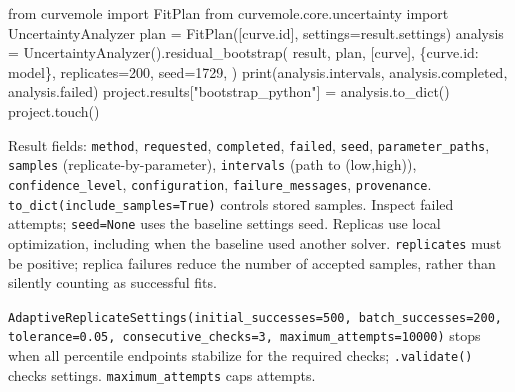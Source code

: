 \documentclass[
  10pt,
  a4paper,
  oneside]{scrreprt}
\newenvironment{Shaded}{}{}
\newcommand{\BuiltInTok}[1]{#1}
\newcommand{\DecValTok}[1]{\textcolor[rgb]{0.25,0.63,0.44}{#1}}
\newcommand{\ImportTok}[1]{#1}
\newcommand{\NormalTok}[1]{#1}
\newcommand{\OperatorTok}[1]{\textcolor[rgb]{0.40,0.40,0.40}{#1}}
\newcommand{\StringTok}[1]{\textcolor[rgb]{0.25,0.44,0.63}{#1}}
\begin{document}
\begin{Shaded}
\begin{Highlighting}[]
\ImportTok{from}\NormalTok{ curvemole }\ImportTok{import}\NormalTok{ FitPlan}
\ImportTok{from}\NormalTok{ curvemole.core.uncertainty }\ImportTok{import}\NormalTok{ UncertaintyAnalyzer}
\NormalTok{plan }\OperatorTok{=}\NormalTok{ FitPlan([curve.}\BuiltInTok{id}\NormalTok{], settings}\OperatorTok{=}\NormalTok{result.settings)}
\NormalTok{analysis }\OperatorTok{=}\NormalTok{ UncertaintyAnalyzer().residual\_bootstrap(}
\NormalTok{    result, plan, [curve], \{curve.}\BuiltInTok{id}\NormalTok{: model\}, replicates}\OperatorTok{=}\DecValTok{200}\NormalTok{, seed}\OperatorTok{=}\DecValTok{1729}\NormalTok{,}
\NormalTok{)}
\BuiltInTok{print}\NormalTok{(analysis.intervals, analysis.completed, analysis.failed)}
\NormalTok{project.results[}\StringTok{"bootstrap\_python"}\NormalTok{] }\OperatorTok{=}\NormalTok{ analysis.to\_dict()}
\NormalTok{project.touch()}
\end{Highlighting}
\end{Shaded}

Result fields: \texttt{method}, \texttt{requested}, \texttt{completed},
\texttt{failed}, \texttt{seed}, \texttt{parameter\_paths},
\texttt{samples} (replicate-by-parameter), \texttt{intervals} (path to
(low,high)), \texttt{confidence\_level}, \texttt{configuration},
\texttt{failure\_messages}, \texttt{provenance}.
\texttt{to\_dict(include\_samples=True)} controls stored samples.
Inspect failed attempts; \texttt{seed=None} uses the baseline settings
seed. Replicas use local optimization, including when the baseline used
another solver. \texttt{replicates} must be positive; replica failures
reduce the number of accepted samples, rather than silently counting as
successful fits.

\texttt{AdaptiveReplicateSettings(initial\_successes=500,\ batch\_successes=200,\ tolerance=0.05,\ consecutive\_checks=3,\ maximum\_attempts=10000)}
stops when all percentile endpoints stabilize for the required checks;
\texttt{.validate()} checks settings. \texttt{maximum\_attempts} caps
attempts.
\end{document}
